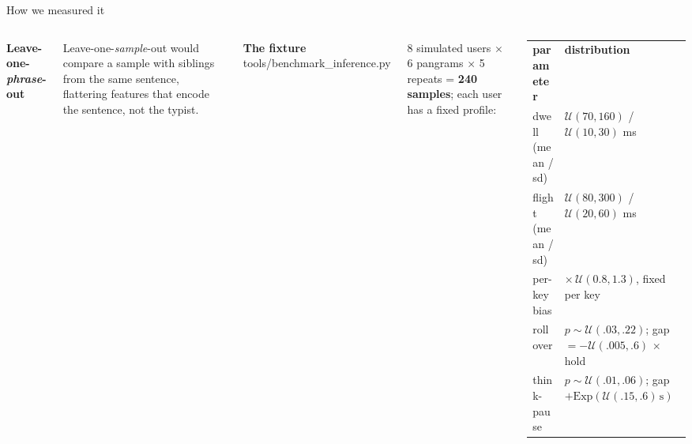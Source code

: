 \documentclass[aspectratio=169,11pt,t]{beamer}
\newcommand\code[1]{{\ttfamily\color{terradk}#1}}
\newcommand\swatch[1]{\textcolor{#1}{\rule[-0.1ex]{7pt}{7pt}}}
\begin{document}
\begin{frame}{How we measured it}
\begin{columns}[T,onlytextwidth]
{\small\bfseries Leave-one-\emph{phrase}-out}\par\vspace{1mm}
\centering
{}
\raggedright
\vspace{1mm}

\scriptsize Leave-one-\emph{sample}-out would compare a sample with siblings from the same sentence, flattering features that
encode the sentence, not the typist.

{\small\bfseries The fixture} {\scriptsize\code{tools/benchmark\_inference.py}}\par\vspace{1mm}
\scriptsize 8 simulated users \(\times\) 6 pangrams \(\times\) 5 repeats = \textbf{240 samples}; each user has a fixed profile:

\vspace{1mm}
\renewcommand\arraystretch{1.04}
\setlength\tabcolsep{4pt}
\begin{tabular}{@{}l l@{}}
\rowcolor{ink}\textcolor{cream}{\bfseries parameter} & \textcolor{cream}{\bfseries distribution}\\
dwell (mean / sd)     & \(\mathcal U(70,160)\) / \(\mathcal U(10,30)\) ms \\ \midrule
flight (mean / sd)    & \(\mathcal U(80,300)\) / \(\mathcal U(20,60)\) ms \\ \midrule
per-key bias          & \(\times\,\mathcal U(0.8,1.3)\), fixed per key \\ \midrule
\rowcolor{terra!8} rollover & \(p\sim\mathcal U(.03,.22)\); gap \(=-\mathcal U(.005,.6)\,\times\) hold \\ \midrule
\rowcolor{terra!8} think-pause & \(p\sim\mathcal U(.01,.06)\); gap \(+\mathrm{Exp}(\mathcal U(.15,.6)\,\text{s})\) \\
\end{tabular}


\end{columns}
\end{frame}
\end{document}
